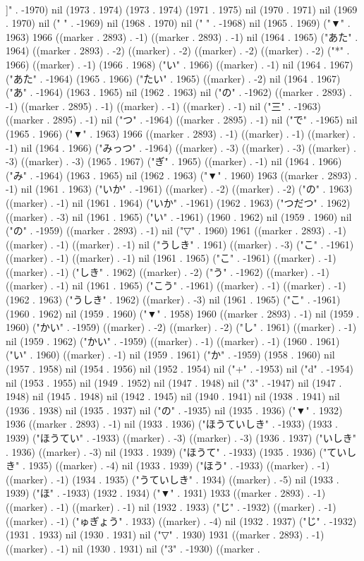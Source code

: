 \\]" . -1970) nil (1973 . 1974) (1973 . 1974) (1971 . 1975) nil (1970 . 1971) nil (1969 . 1970) nil (" " . -1969) nil (1968 . 1970) nil (" " . -1968) nil (1965 . 1969) ("▼" . 1963) 1966 ((marker . 2893) . -1) ((marker . 2893) . -1) nil (1964 . 1965) ("あた" . 1964) ((marker . 2893) . -2) ((marker) . -2) ((marker) . -2) ((marker) . -2) ("*" . 1966) ((marker) . -1) (1966 . 1968) ("い" . 1966) ((marker) . -1) nil (1964 . 1967) ("あた" . -1964) (1965 . 1966) ("たい" . 1965) ((marker) . -2) nil (1964 . 1967) ("あ" . -1964) (1963 . 1965) nil (1962 . 1963) nil ("の" . -1962) ((marker . 2893) . -1) ((marker . 2895) . -1) ((marker) . -1) ((marker) . -1) nil ("三" . -1963) ((marker . 2895) . -1) nil ("つ" . -1964) ((marker . 2895) . -1) nil ("で" . -1965) nil (1965 . 1966) ("▼" . 1963) 1966 ((marker . 2893) . -1) ((marker) . -1) ((marker) . -1) nil (1964 . 1966) ("みっつ" . -1964) ((marker) . -3) ((marker) . -3) ((marker) . -3) ((marker) . -3) (1965 . 1967) ("ぎ" . 1965) ((marker) . -1) nil (1964 . 1966) ("み" . -1964) (1963 . 1965) nil (1962 . 1963) ("▼" . 1960) 1963 ((marker . 2893) . -1) nil (1961 . 1963) ("いか" . -1961) ((marker) . -2) ((marker) . -2) ("の" . 1963) ((marker) . -1) nil (1961 . 1964) ("いか" . -1961) (1962 . 1963) ("つだつ" . 1962) ((marker) . -3) nil (1961 . 1965) ("い" . -1961) (1960 . 1962) nil (1959 . 1960) nil ("の" . -1959) ((marker . 2893) . -1) nil ("▽" . 1960) 1961 ((marker . 2893) . -1) ((marker) . -1) ((marker) . -1) nil ("うしき" . 1961) ((marker) . -3) ("こ" . -1961) ((marker) . -1) ((marker) . -1) nil (1961 . 1965) ("こ" . -1961) ((marker) . -1) ((marker) . -1) ("しき" . 1962) ((marker) . -2) ("う" . -1962) ((marker) . -1) ((marker) . -1) nil (1961 . 1965) ("こう" . -1961) ((marker) . -1) ((marker) . -1) (1962 . 1963) ("うしき" . 1962) ((marker) . -3) nil (1961 . 1965) ("こ" . -1961) (1960 . 1962) nil (1959 . 1960) ("▼" . 1958) 1960 ((marker . 2893) . -1) nil (1959 . 1960) ("かい" . -1959) ((marker) . -2) ((marker) . -2) ("し" . 1961) ((marker) . -1) nil (1959 . 1962) ("かい" . -1959) ((marker) . -1) ((marker) . -1) (1960 . 1961) ("い" . 1960) ((marker) . -1) nil (1959 . 1961) ("か" . -1959) (1958 . 1960) nil (1957 . 1958) nil (1954 . 1956) nil (1952 . 1954) nil ("+" . -1953) nil ("d" . -1954) nil (1953 . 1955) nil (1949 . 1952) nil (1947 . 1948) nil ("3" . -1947) nil (1947 . 1948) nil (1945 . 1948) nil (1942 . 1945) nil (1940 . 1941) nil (1938 . 1941) nil (1936 . 1938) nil (1935 . 1937) nil ("の" . -1935) nil (1935 . 1936) ("▼" . 1932) 1936 ((marker . 2893) . -1) nil (1933 . 1936) ("ほうていしき" . -1933) (1933 . 1939) ("ほうてい" . -1933) ((marker) . -3) ((marker) . -3) (1936 . 1937) ("いしき" . 1936) ((marker) . -3) nil (1933 . 1939) ("ほうて" . -1933) (1935 . 1936) ("ていしき" . 1935) ((marker) . -4) nil (1933 . 1939) ("ほう" . -1933) ((marker) . -1) ((marker) . -1) (1934 . 1935) ("うていしき" . 1934) ((marker) . -5) nil (1933 . 1939) ("ほ" . -1933) (1932 . 1934) ("▼" . 1931) 1933 ((marker . 2893) . -1) ((marker) . -1) ((marker) . -1) nil (1932 . 1933) ("じ" . -1932) ((marker) . -1) ((marker) . -1) ("ゅぎょう" . 1933) ((marker) . -4) nil (1932 . 1937) ("じ" . -1932) (1931 . 1933) nil (1930 . 1931) nil ("▽" . 1930) 1931 ((marker . 2893) . -1) ((marker) . -1) nil (1930 . 1931) nil ("3" . -1930) ((marker . 